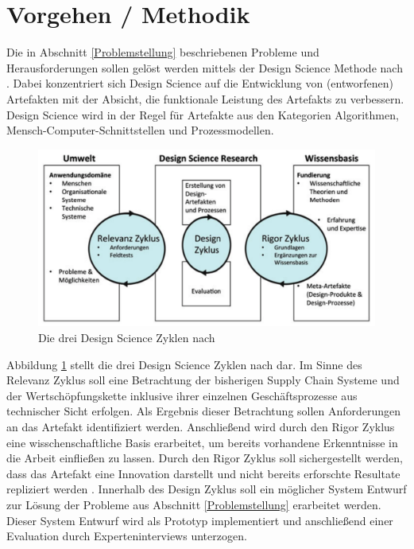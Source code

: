 \section{Vorgehen / Methodik}

Die in Abschnitt \ref{Problemstellung} beschriebenen Probleme und Herausforderungen sollen gelöst werden mittels der Design Science Methode nach \citet{Hevner2004, Hevner2007}. Dabei konzentriert sich Design Science auf die Entwicklung von (entworfenen) Artefakten mit der Absicht, die funktionale Leistung des Artefakts zu verbessern. Design Science wird in der Regel für Artefakte aus den Kategorien Algorithmen, Mensch-Computer-Schnittstellen und Prozessmodellen.\citep{Peffers2012, Kuechler2008}

\begin{figure}[h!]
	\centering
	\includegraphics[width=1.0\linewidth]{pictures/three-cycles-design-science}
	\caption[Die drei Design Science Zyklen nach Hevner]{Die drei Design Science Zyklen nach \citet{Hevner2010}}
	\label{fig:three-cycles-design-science}
\end{figure}

Abbildung \ref{fig:three-cycles-design-science} stellt die drei Design Science Zyklen nach \citet{Hevner2010} dar. Im Sinne des Relevanz Zyklus \citep[siehe auch][]{Simon1996} soll eine Betrachtung der bisherigen Supply Chain Systeme und der Wertschöpfungskette inklusive ihrer einzelnen Geschäftsprozesse aus technischer Sicht erfolgen. Als Ergebnis dieser Betrachtung sollen Anforderungen an das Artefakt identifiziert werden. Anschließend wird durch den Rigor Zyklus eine wisschenschaftliche Basis erarbeitet, um bereits vorhandene Erkenntnisse in die Arbeit einfließen zu lassen. Durch den Rigor Zyklus soll sichergestellt werden, dass das Artefakt eine Innovation darstellt und nicht bereits erforschte Resultate repliziert werden \citep{Hevner2010}. Innerhalb des Design Zyklus soll ein möglicher System Entwurf zur Lösung der Probleme aus Abschnitt \ref{Problemstellung} erarbeitet werden. Dieser System Entwurf wird als Prototyp implementiert und anschließend einer Evaluation durch Experteninterviews \citep[siehe auch][]{Wilde2007} unterzogen.

\newpage
